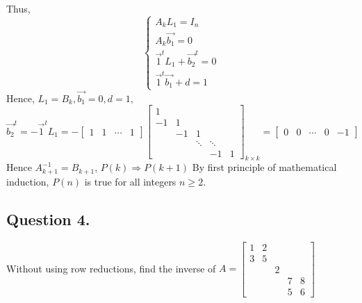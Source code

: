 \documentclass{article}
\begin{document}
Thus,
\[\left\{\begin{array}{l}A_kL_1=I_n\\A_k\Vec{b_1}=0\\\Vec{1}^tL_1+\Vec{b_2}^t=0\\\Vec{1}^t\Vec{b_1}+d=1\end{array}\right.\]
Hence, $L_1=B_k,\Vec{b_1}=0,d=1,$\newline
$\Vec{b_2}^t=-\Vec{1}^tL_1=-[\begin{array}{rrrr}1&1&\cdots&1\end{array}]\left[\begin{array}{rrrrr}1\\-1&1\\&-1&1\\&&\ddots&\ddots\\&&&-1&1\end{array}\right]_{k\times k}=[\begin{array}{rrrrr}0&0&\cdots&0&-1\end{array}]$\newline
Hence $A_{k+1}^{-1}=B_{k+1}$, $P(k)\Rightarrow P(k+1)$\newline
By first principle of mathematical induction, $P(n)$ is true for all integers $n \geq 2$.
\subsection*{Question 4.}
Without using row reductions, find the inverse of $A=\left[\begin{array}{ccccc}1&2\\3&5\\&&2\\&&&7&8\\&&&5&6\end{array}\right]$
\end{document}
